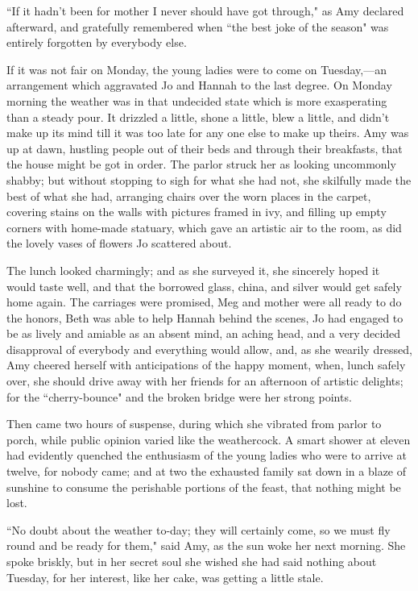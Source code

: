 ``If it hadn't been for mother I never should have got
through," as Amy declared afterward, and gratefully remembered when ``the
best joke of the season" was entirely forgotten by everybody else.

If it was not fair on Monday, the young ladies were to come on
Tuesday,---an arrangement which aggravated Jo and Hannah to the last
degree. On Monday morning the weather was in that undecided state which
is more exasperating than a steady pour. It drizzled a little, shone a
little, blew a little, and didn't make up its mind till
it was too late for any one else to make up theirs. Amy was up at dawn,
hustling people out of their beds and through their breakfasts, that the
house might be got in order. The parlor struck her as looking uncommonly
shabby; but without stopping to sigh for what she had not, she skilfully
made the best of what she had, arranging chairs over the worn places in
the carpet, covering stains on the walls with pictures framed in ivy,
and filling up empty corners with home-made statuary, which gave an
artistic air to the room, as did the lovely vases of flowers Jo
scattered about.

The lunch looked charmingly; and as she surveyed it, she sincerely hoped
it would taste well, and that the borrowed glass, china, and silver
would get safely home again. The carriages were promised, Meg and mother
were all ready to do the honors, Beth was able to help Hannah behind the
scenes, Jo had engaged to be as lively and amiable as an absent mind, an
aching head, and a very decided disapproval of everybody and everything
would allow, and, as she wearily dressed, Amy cheered herself with
anticipations of the happy moment, when, lunch safely over, she should
drive away with her friends for an afternoon of artistic delights; for
the ``cherry-bounce" and the broken bridge were her strong points.

Then came two hours of suspense, during which she vibrated from parlor
to porch, while public opinion varied like the weathercock. A smart
shower at eleven had evidently quenched the enthusiasm of the young
ladies who were to arrive at twelve, for nobody came; and at two the
exhausted family sat down in a blaze of sunshine to consume the
perishable portions of the feast, that nothing might be lost.

``No doubt about the weather to-day; they will certainly come, so we must
fly round and be ready for them," said Amy, as the sun woke her next
morning. She spoke briskly, but in her secret soul she wished she had
said nothing about Tuesday, for her interest, like her cake, was getting
a little stale.

